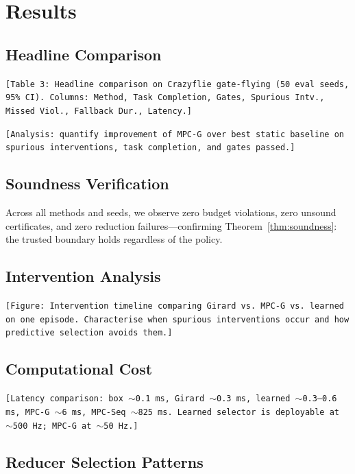 \documentclass{article}
\newcommand{\placeholder}[1]{\texttt{[#1]}}
\begin{document}
\section{Results}\label{sec:results}

\subsection{Headline Comparison}

\placeholder{Table~3: Headline comparison on Crazyflie gate-flying (50 eval seeds, 95\% CI). Columns: Method, Task Completion, Gates, Spurious Intv., Missed Viol., Fallback Dur., Latency.}

\placeholder{Analysis: quantify improvement of MPC-G over best static baseline on spurious interventions, task completion, and gates passed.}

\subsection{Soundness Verification}

Across all methods and seeds, we observe zero budget violations, zero unsound certificates, and zero reduction failures---confirming Theorem~\ref{thm:soundness}: the trusted boundary holds regardless of the policy.

\subsection{Intervention Analysis}

\placeholder{Figure: Intervention timeline comparing Girard vs.\ MPC-G vs.\ learned on one episode. Characterise when spurious interventions occur and how predictive selection avoids them.}

\subsection{Computational Cost}

\placeholder{Latency comparison: box ${\sim}$0.1\,ms, Girard ${\sim}$0.3\,ms, learned ${\sim}$0.3--0.6\,ms, MPC-G ${\sim}$6\,ms, MPC-Seq ${\sim}$825\,ms. Learned selector is deployable at ${\sim}$500\,Hz; MPC-G at ${\sim}$50\,Hz.}

\subsection{Reducer Selection Patterns}
\end{document}
